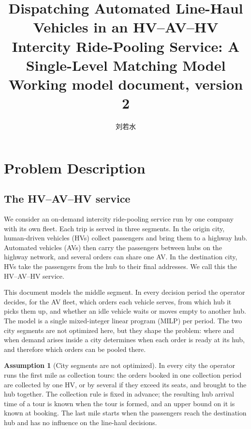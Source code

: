 \documentclass[12pt]{article}
\theoremstyle{plain}
\theoremstyle{definition}
\newtheorem{assumption}{Assumption}
\begin{document}
\title{Dispatching Automated Line-Haul Vehicles in an HV--AV--HV Intercity Ride-Pooling Service: A Single-Level Matching Model\\[4pt]
\large Working model document, version 2}
\author{刘若水}
\date{}

\maketitle

\section{Problem Description}

\subsection{The HV--AV--HV service}

We consider an on-demand intercity ride-pooling service run by one company with its own fleet. Each trip is served in three segments. In the origin city, human-driven vehicles (HVs) collect passengers and bring them to a highway hub. Automated vehicles (AVs) then carry the passengers between hubs on the highway network, and several orders can share one AV. In the destination city, HVs take the passengers from the hub to their final addresses. We call this the HV--AV--HV service.

This document models the middle segment. In every decision period the operator decides, for the AV fleet, which orders each vehicle serves, from which hub it picks them up, and whether an idle vehicle waits or moves empty to another hub. The model is a single mixed-integer linear program (MILP) per period. The two city segments are not optimized here, but they shape the problem: where and when demand arises inside a city determines when each order is ready at its hub, and therefore which orders can be pooled there.

\begin{assumption}[City segments are not optimized]\label{as:exo}
In every city the operator runs the first mile as collection tours: the orders booked in one collection period are collected by one HV, or by several if they exceed its seats, and brought to the hub together. The collection rule is fixed in advance; the resulting hub arrival time of a tour is known when the tour is formed, and an upper bound on it is known at booking. The last mile starts when the passengers reach the destination hub and has no influence on the line-haul decisions.
\end{assumption}
\end{document}
